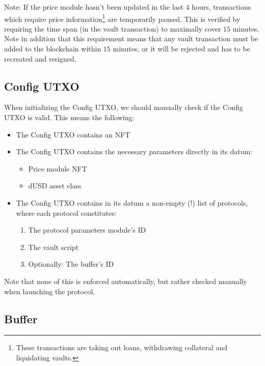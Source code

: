 \documentclass{article} %
\begin{document}

Note: If the price module hasn't been updated in the last $4$ hours,
transactions which require price information\footnote{
  These transactions are taking out loans, withdrawing collateral and
  liquidating vaults.
} are temporarily paused. This is verified by requiring the time span (in the
vault transaction) to maximally cover $15$ minutes. Note in addition that this
requirement means that any vault transaction must be added to the blockchain
within $15$ minutes, or it will be rejected and has to be recreated and
resigned.

\subsection{Config UTXO}

When initializing the Config UTXO, we should manually check if the Config UTXO
is valid. This means the following:
\begin{itemize}
  \item The Config UTXO contains an NFT
  \item The Config UTXO contains the necessary parameters directly in its datum:
    \begin{itemize}
      \item Price module NFT
      \item dUSD asset class
    \end{itemize}
  \item The Config UTXO contains in its datum a non-empty (!) list of protocols,
    where each protocol constitutes:
    \begin{enumerate}
      \item The protocol parameters module's ID
      \item The vault script
      \item Optionally: The buffer's ID
    \end{enumerate}
\end{itemize}

Note that none of this is enforced automatically, but rather checked manually
when launching the protocol.


\subsection{Buffer}
\end{document}
